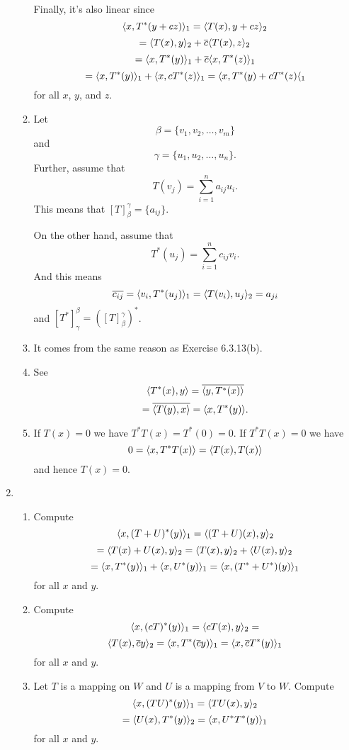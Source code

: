 \begin{enumerate}
\begin{enumerate}
Finally, it's also linear since 
\[\langle x,T^*(y+cz)\rangle_1 =\langle T(x),y+cz\rangle_2 \]
\[=\langle T(x),y\rangle_2 +\overline{c}\langle T(x),z\rangle_2 \]
\[=\langle x,T^*(y)\rangle_1 +\overline{c}\langle x,T^*(z)\rangle_1 \]
\[=\langle x,T^*(y)\rangle_1 +\langle x,cT^*(z)\rangle_1 =\langle x,T^*(y)+cT^*(z)\langle_1 \]
for all $x$, $y$, and $z$.
\item Let 
\[\beta =\{v_1,v_2,\ldots ,v_m\}\]
and
\[\gamma =\{u_1,u_2,\ldots ,u_n\}.\]
Further, assume that 
\[T(v_j)=\sum_{i=1}^n{a_{ij}u_i}.\]
This means that $[T]_{\beta}^{\gamma}=\{a_{ij}\}$. 

On the other hand, assume that 
\[T^*(u_j)=\sum_{i=1}^n{c_{ij}v_i}.\]
And this means 
\[\overline{c_{ij}}=\langle v_i,T^*(u_j)\rangle_1 =\langle T(v_i),u_j\rangle_2 =a_{ji}\]
and $[T^*]_{\gamma}^{\beta}=([T]_{\beta}^{\gamma})^*$.
\item It comes from the same reason as Exercise 6.3.13(b).
\item See 
\[\langle T^*(x),y\rangle =\overline{\langle y,T^*(x)\rangle }\]
\[=\overline{\langle T(y),x\rangle }=\langle x,T^*(y)\rangle .\]
\item If $T(x)=0$ we have $T^*T(x)=T^*(0)=0$. If $T^*T(x)=0$ we have 
\[0=\langle x,T^*T(x)\rangle =\langle T(x),T(x)\rangle \]
and hence $T(x)=0$.
\end{enumerate}
\item \begin{enumerate}
\item Compute 
\[\langle x,(T+U)^*(y)\rangle_1=\langle (T+U)(x),y\rangle_2\]
\[=\langle T(x)+U(x),y\rangle_2 =\langle T(x),y\rangle_2+\langle U(x),y\rangle_2 \]
\[=\langle x,T^*(y)\rangle_1+\langle x,U^*(y)\rangle_1=\langle x,(T^*+U^*)(y)\rangle_1\]
for all $x$ and $y$.
\item Compute 
\[\langle x,(cT)^*(y)\rangle_1 =\langle cT(x),y\rangle_2 =\]
\[\langle T(x),\overline{c}y\rangle_2 =\langle x,T^*(\overline{c}y)\rangle_1 =\langle x,\overline{c}T^*(y)\rangle_1 \]
for all $x$ and $y$.
\item Let $T$ is a mapping on $W$ and $U$ is a mapping from $V$ to $W$. Compute 
\[\langle x,(TU)^*(y)\rangle_1 =\langle TU(x),y\rangle_2 \]
\[=\langle U(x),T^*(y)\rangle_2 =\langle x,U^*T^*(y)\rangle_1 \]
for all $x$ and $y$.


\end{enumerate}
\end{enumerate}
